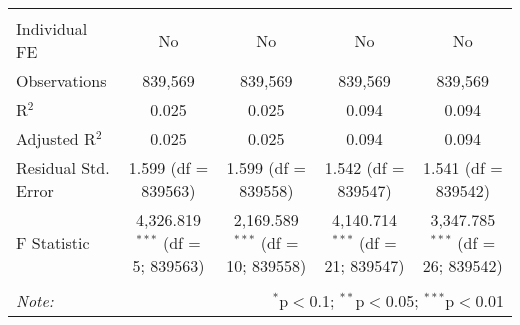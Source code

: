 \documentclass[
]{article}
\begin{document}
\begin{table}[!htbp]
{\begin{tabular}{@{\extracolsep{5pt}}lcccc}
  & & & & \\ 
\hline \\[-1.8ex] 
Individual FE & No & No & No & No \\ 
Observations & 839,569 & 839,569 & 839,569 & 839,569 \\ 
R$^{2}$ & 0.025 & 0.025 & 0.094 & 0.094 \\ 
Adjusted R$^{2}$ & 0.025 & 0.025 & 0.094 & 0.094 \\ 
Residual Std. Error & 1.599 (df = 839563) & 1.599 (df = 839558) & 1.542 (df = 839547) & 1.541 (df = 839542) \\ 
F Statistic & 4,326.819$^{***}$ (df = 5; 839563) & 2,169.589$^{***}$ (df = 10; 839558) & 4,140.714$^{***}$ (df = 21; 839547) & 3,347.785$^{***}$ (df = 26; 839542) \\ 
\hline 
\hline \\[-1.8ex] 
\textit{Note:}  & \multicolumn{4}{r}{$^{*}$p$<$0.1; $^{**}$p$<$0.05; $^{***}$p$<$0.01} \\ 
\end{tabular}
} 
\end{table} 
\newpage
\end{document}
